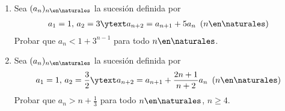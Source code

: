 \begin{enunciado}{\ejercicio}
  \begin{enumerate}[label=\roman*)]
    \item Sea $(a_n)_{n \en \naturales }$ la sucesión definida por
          \begin{align*}
            a_1 = 1,\, a_2 = 3 \ytext a_{n+2} = a_{n+1} + 5a_n \, \, \, (n \en \naturales )
          \end{align*}
          Probar que $a_n < 1 + 3^{n-1}$ para todo $n \en \naturales $.

    \item Sea $(a_n)_{n \en \naturales }$ la sucesión definida por
          \begin{align*}
            a_1 = 1,\, a_2 = \frac{3}{2} \ytext a_{n+2} = a_{n+1} + \frac{2n+1}{n+2}a_n \, \, \, (n \en \naturales )
          \end{align*}
          Probar que $a_n > n + \displaystyle \frac{1}{3}$ para todo $n \en \naturales $, $n \geq 4$.
  \end{enumerate}
\end{enunciado}

